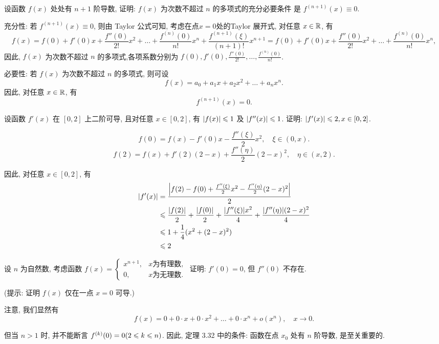 \begin{exercise}[3.6.7]
    设函数 $f(x)$ 处处有 $n + 1$ 阶导数, 证明: $f(x)$ 为次数不超过 $n$ 的多项式的充分必要条件 是 $f^{(n+1)}(x) \equiv 0$.
\end{exercise}

\begin{solution}
    充分性: 若 $f^{(n+1)}(x) \equiv 0$, 则由 Taylor 公式可知, 考虑在点$x=0$处的Taylor 展开式, 对任意 $x \in \mathbb{R}$, 有
    $$f(x) = f(0) + f'(0)x + \frac{f''(0)}{2!}x^2 + \dots + \frac{f^{(n)}(0)}{n!}x^n + \frac{f^{(n+1)}(\xi)}{(n+1)!}x^{n+1} = f(0) + f'(0)x + \frac{f''(0)}{2!}x^2 + \dots + \frac{f^{(n)}(0)}{n!}x^n,$$
    因此, $f(x)$ 为次数不超过 $n$ 的多项式,各项系数分别为 $f(0), f'(0), \frac{f''(0)}{2!}, \dots, \frac{f^{(n)}(0)}{n!}$.

    必要性: 若 $f(x)$ 为次数不超过 $n$ 的多项式, 则可设
    $$f(x) = a_0 + a_1 x + a_2 x^2 + \dots + a_n x^n.$$
    因此, 对任意 $x \in \mathbb{R}$, 有
    $$f^{(n+1)}(x) = 0.$$
\end{solution}

\begin{exercise}[3.6.8]
    设函数 $f'(x)$ 在 $[0, 2]$ 上二阶可导, 且对任意 $x \in [0, 2]$, 有 $|f(x)| \leqslant 1$ 及 $|f''(x)| \leqslant 1$. 证明: $|f'(x)| \leqslant 2, x \in [0, 2]$.
\end{exercise}

\begin{solution}
    $$f(0) = f(x) - f'(0)x - \frac{f''(\xi)}{2}x^2, \quad \xi \in (0, x).$$
    $$f(2) = f(x) + f'(2)(2 - x) + \frac{f''(\eta)}{2}(2 - x)^2, \quad \eta \in (x, 2).$$

    因此, 对任意 $x \in [0, 2]$, 有
    \begin{align*}
        |f'(x)| & = \frac{\left|f(2) - f(0) + \frac{f''(\xi)}{2}x^2 - \frac{f''(\eta)}{2}(2 - x)^2\right|}{2}         \\
                & \leqslant \frac{|f(2)|}{2} + \frac{|f(0)|}{2} + \frac{|f''(\xi)|x^2}{4} + \frac{|f''(\eta)|(2 - x)^2}{4} \\
                & \leqslant 1 + \frac{1}{4}(x^2 + (2 - x)^2)                                                               \\
                & \leqslant 2
    \end{align*}
\end{solution}

\begin{exercise}[3.6.9]
    设 $n$ 为自然数, 考虑函数 $f(x) = \begin{cases} x^{n+1}, & x \text{为有理数}, \\ 0, & x \text{为无理数}. \end{cases}$ 证明: $f'(0) = 0$, 但 $f''(0)$ 不存在.

    (提示: 证明 $f(x)$ 仅在一点 $x=0$ 可导.)

    注意, 我们显然有
    $$f(x) = 0 + 0 \cdot x + 0 \cdot x^2 + \dots + 0 \cdot x^n + o(x^n), \quad x \to 0.$$

    但当 $n > 1$ 时, 并不能断言 $f^{(k)}(0) = 0 (2 \leqslant k \leqslant n)$. 因此, 定理 3.32 中的条件: 函数在点 $x_0$ 处有 $n$ 阶导数, 是至关重要的.
\end{exercise}

